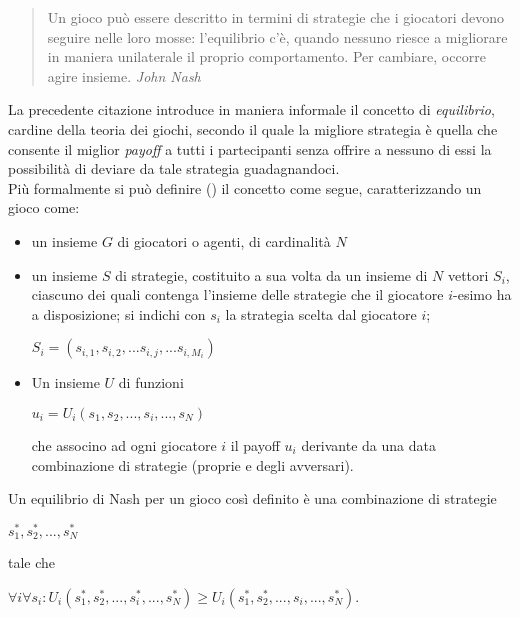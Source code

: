 \begin{quote}
Un gioco può essere descritto in termini di strategie che i giocatori devono seguire nelle loro mosse: l'equilibrio c'è, quando nessuno riesce a migliorare in maniera unilaterale il proprio comportamento. Per cambiare, occorre agire insieme. \emph{John Nash}
\end{quote}
La precedente citazione introduce in maniera informale il concetto di \emph{equilibrio}, cardine della teoria dei giochi, secondo il quale la migliore strategia è quella che consente il miglior \emph{payoff} a tutti i partecipanti senza offrire a nessuno di essi la possibilità di deviare da tale strategia guadagnandoci.\vspace*{.7cm} \\
Più formalmente si può definire (\cite{eponimo}) il concetto come segue, caratterizzando un gioco come:
\begin{itemize}
   \item un insieme $G$ di giocatori o agenti, di cardinalità $N$ 
   \item un insieme $S$ di strategie, costituito a sua volta da un insieme di $N$ vettori $S_i$, ciascuno dei quali contenga l'insieme delle strategie che il giocatore $i$-esimo ha a disposizione; si indichi con $s_i$ la strategia scelta dal giocatore $i$;
\begin{center}
   $S_i = (s_{i,1},s_{i,2},...s_{i,j},...s_{i,M_i})$
\end{center}   
\item Un insieme $U$ di funzioni
\begin{center}
   $u_i=U_i\left(s_1, s_2,...,s_i,...,s_N\right)$
\end{center}
che associno ad ogni giocatore $i$ il payoff $u_i$ derivante da una data combinazione di strategie (proprie e degli avversari).
\end{itemize}


Un equilibrio di Nash per un gioco così definito è una combinazione di strategie
\begin{center}
   $s_1^*, s_2^*,...,s_N^*$
\end{center}

tale che

\begin{center}
    $  \forall i \forall s_i :   U_i\left(s_1^*, s_2^*,...,s_i^*,...,s_N^*\right)\ge U_i\left(s_1^*, s_2^*,...,s_i,...,s_N^*\right)$.
\end{center}


